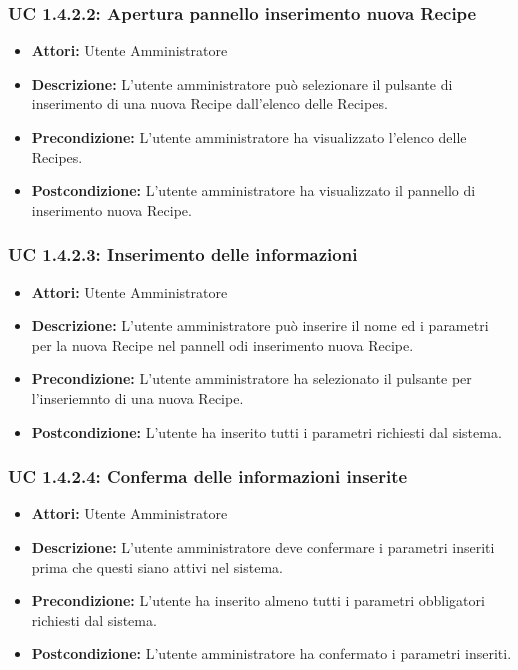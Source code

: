 \subsubsection{UC 1.4.2.2: Apertura pannello inserimento nuova Recipe}

\begin{itemize}
\item \textbf{Attori:} Utente Amministratore
\item \textbf{Descrizione:} L'utente amministratore può selezionare il pulsante di inserimento di una nuova Recipe dall'elenco delle Recipes.
\item \textbf{Precondizione:} L'utente amministratore ha visualizzato l'elenco delle Recipes.
\item \textbf{Postcondizione:} L'utente amministratore ha visualizzato il pannello di inserimento nuova Recipe.
\end{itemize}

\subsubsection{UC 1.4.2.3: Inserimento delle informazioni }

\begin{itemize}
\item \textbf{Attori:} Utente Amministratore
\item \textbf{Descrizione:} L'utente amministratore può inserire il nome ed i parametri per la nuova Recipe nel pannell odi inserimento nuova Recipe.
\item \textbf{Precondizione:} L'utente amministratore ha selezionato il pulsante per l'inseriemnto di una nuova Recipe.
\item \textbf{Postcondizione:} L'utente ha inserito tutti i parametri richiesti dal sistema.
\end{itemize}

\subsubsection{UC 1.4.2.4: Conferma delle informazioni inserite}

\begin{itemize}
\item \textbf{Attori:} Utente Amministratore
\item \textbf{Descrizione:} L'utente amministratore deve confermare i parametri inseriti prima che questi siano attivi nel sistema.
\item \textbf{Precondizione:} L'utente ha inserito almeno tutti i parametri obbligatori richiesti dal sistema.
\item \textbf{Postcondizione:} L'utente amministratore ha confermato i parametri inseriti.
\end{itemize}

